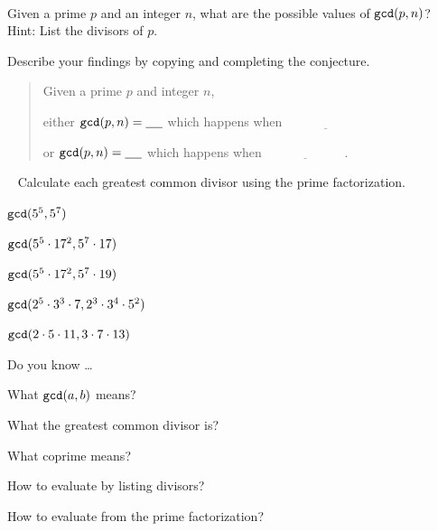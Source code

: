 \begin{exer}[\exerU] %
\label{exer_gcd_with_prime}    
~
    \begin{exerpart}
        \item Given a prime $p$ and an integer $n$, what are the possible values of $\texttt{gcd}(p,n)$?  Hint: List the divisors of $p$.
        \item Describe your findings by copying and completing the conjecture.
            \begin{quote} 
                Given a prime $p$ and integer $n$,
            
                either $\texttt{gcd}(p,n) = \underline{\quad~}$ which happens when $ \underline{\hspace{1in} ~}$ 
            
                or $\texttt{gcd}(p,n) = \underline{\quad~}$ which happens when $ \underline{\hspace{1in} ~}$.
            \end{quote} 
    \end{exerpart}
\end{exer}

\begin{exer}[\exerU] %
\label{exer_gcd_from_prime_fact_examples}
~
    Calculate each greatest common divisor using the prime factorization. 
        \begin{exerpart}
            \item $\texttt{gcd}(5^5,5^7)$
            \item $\texttt{gcd}(5^5 \cdot 17^2,5^7 \cdot 17)$
            \item $\texttt{gcd}(5^5 \cdot 17^2,5^7 \cdot 19)$
            \item $\texttt{gcd}(2^5 \cdot 3^3 \cdot 7,2^3 \cdot 3^4 \cdot 5^2)$
            \item $\texttt{gcd}(2 \cdot 5 \cdot 11,3 \cdot 7 \cdot 13)$   
        \end{exerpart}   
\end{exer}

\begin{exer}[\exerR] %
\label{exer_dyk_gcd}
    Do you know \ldots
        \begin{exerpart}
            \item What $\texttt{gcd}(a,b)$ means?
            \item What the greatest common divisor is?
            \item What coprime means?
            \item How to evaluate  by listing divisors? 
            \item How to evaluate  from the prime factorization?
        \end{exerpart}
\end{exer}

